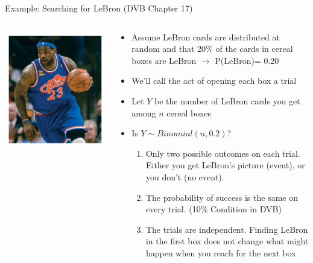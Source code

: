 \documentclass[10pt,handout]{beamer}\usepackage[]{graphicx}\usepackage[]{color}
\begin{document}
\begin{frame}{Example: Searching for LeBron (DVB Chapter 17)}
	\begin{columns}
		\begin{column}{0.2\textwidth}
			\includegraphics[scale=0.2]{lebron.png}
		\end{column}
		\begin{column}{0.78\textwidth}
			\small
			\begin{itemize}
				\item Assume LeBron cards are distributed at random and
				that 20\% of the cards in cereal boxes are LeBron $\to$ P(LeBron)= 0.20
				\item We'll call the act of opening each box a trial
				\item Let $Y$ be the number of LeBron cards you get among $n$ cereal boxes
				\item Is $Y\sim Binomial(n,0.2)$? \pause
				\begin{enumerate}
					\item Only two possible outcomes on each trial. Either you get LeBron's picture (event), or you don't (no event).
					\item The probability of success is the same on every trial. (10\% Condition in DVB)
					\item The trials are independent. Finding LeBron in the first box does not change what might happen when you reach for the next box
				\end{enumerate}
			\end{itemize}
		\end{column}
	\end{columns}
	
\end{frame}
\end{document}
